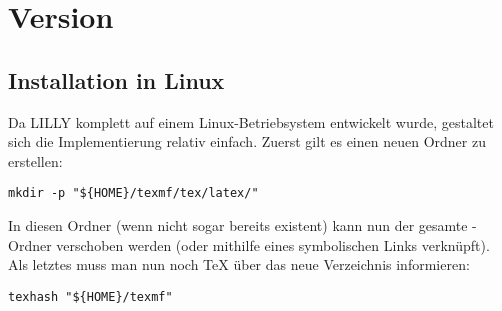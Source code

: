 \section{Version \small{}}
\subsection{Installation in Linux}
Da LILLY komplett auf einem Linux-Betriebsystem entwickelt wurde, gestaltet sich die Implementierung relativ einfach.
Zuerst gilt es einen neuen Ordner zu erstellen:
\begin{lstlisting}[language=lBash]
mkdir -p "${HOME}/texmf/tex/latex/"
\end{lstlisting}
In diesen Ordner (wenn nicht sogar bereits existent) kann nun der gesamte -Ordner verschoben werden (oder mithilfe eines symbolischen Links verknüpft). Als letztes muss man nun noch \TeX{} über das neue Verzeichnis informieren:
\begin{lstlisting}[language=lBash]
texhash "${HOME}/texmf"
\end{lstlisting}

